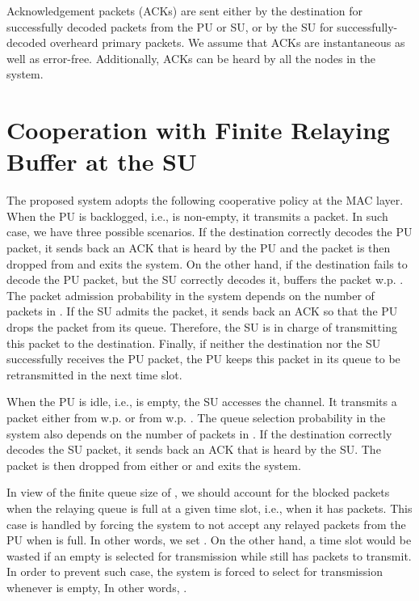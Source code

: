\documentclass[conference]{IEEEtran}
\begin{document}
Acknowledgement packets (ACKs) are sent either by the destination
for successfully decoded packets from the PU or SU, or by the SU
for successfully-decoded overheard primary packets. 
We assume that ACKs are instantaneous as well as error-free. 
Additionally, ACKs can be heard by all the nodes in the system.



\section{Cooperation with Finite Relaying Buffer at the SU}
The proposed system adopts the following cooperative policy at the
MAC layer. When the PU is backlogged, i.e.,  is non-empty, it
transmits a packet. In such case, we have three possible
scenarios.  If the destination correctly decodes the PU packet, it
sends back an ACK that is heard by the PU and the packet is then
dropped from  and exits the system. On the other hand, if the
destination fails to decode the PU packet, but the SU correctly
decodes it,  buffers the packet w.p. . The packet admission probability in the system
depends on the number of packets in . If the SU admits the
packet, it sends back an ACK so that the PU drops
the packet from its queue. Therefore, the SU is in charge of
transmitting this packet to the destination. Finally, if neither
the destination nor the SU successfully receives the PU packet, the
PU keeps this packet in its queue to be retransmitted in the next
time slot.

When the PU is idle, i.e.,  is empty, the SU accesses the
channel. It transmits a packet either from  w.p.  or from  w.p. . The
queue selection probability in the system also depends on the
number of packets in . If the destination correctly
decodes the SU packet, it sends back an ACK that is heard by the
SU. The packet is then dropped from either  or  and
exits the system.

In view of the finite queue size of , we should account
for the blocked packets when the relaying queue is full at a given
time slot, i.e., when it has  packets. This case is handled by
forcing the system to not accept any relayed packets from the PU
when  is full. In other words, we set .
On the other hand, a time slot would be wasted if an empty
 is selected for transmission while  still has
packets to transmit. In order to prevent such case, the system is
forced to select  for transmission whenever  is
empty, In other words, .
\end{document}
